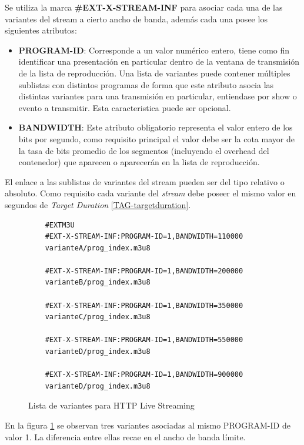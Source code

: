 Se utiliza la marca \textbf{\#EXT-X-STREAM-INF} para asociar cada una de las variantes del stream a cierto ancho de banda, además cada una posee los siguientes atributos:

\begin{itemize}

\item \textbf{PROGRAM-ID}: Corresponde a un valor numérico entero, tiene como fin identificar una presentación en particular dentro de la ventana de transmisión de la lista de reproducción. Una lista de variantes puede contener múltiples sublistas con distintos programas de forma que este atributo asocia las distintas variantes para una transmisión en particular, entiendase por show o evento a transmitir. Esta caracteristica puede ser opcional.

\item \textbf{BANDWIDTH}: Este atributo obligatorio representa el valor entero de los bits por segundo, como requisito principal el valor debe ser la cota mayor de la tasa de bits promedio de los segmentos (incluyendo el overhead del contenedor) que aparecen o aparecerán en la lista de reproducción. 

\end{itemize}

El enlace a las sublistas de variantes del stream pueden ser del tipo relativo o absoluto. Como requisito cada variante del \textit{stream} debe poseer el mismo valor en segundos de \textit{Target Duration} \ref{TAG-targetduration}.

\begin{figure}[H]
	\centering
	\begin{lstlisting}
	#EXTM3U
	#EXT-X-STREAM-INF:PROGRAM-ID=1,BANDWIDTH=110000
	varianteA/prog_index.m3u8
	
	#EXT-X-STREAM-INF:PROGRAM-ID=1,BANDWIDTH=200000
	varianteB/prog_index.m3u8

	#EXT-X-STREAM-INF:PROGRAM-ID=1,BANDWIDTH=350000
	varianteC/prog_index.m3u8

	#EXT-X-STREAM-INF:PROGRAM-ID=1,BANDWIDTH=550000
	varianteD/prog_index.m3u8

	#EXT-X-STREAM-INF:PROGRAM-ID=1,BANDWIDTH=900000
	varianteD/prog_index.m3u8

	\end{lstlisting}
	\caption{Lista de variantes para HTTP Live Streaming}
	\label{ejemploVariantPLS}	
\end{figure}	

En la figura \ref{ejemploVariantPLS} se observan tres variantes asociadas al mismo PROGRAM-ID de valor 1. La diferencia entre ellas recae en el ancho de banda límite.\\

